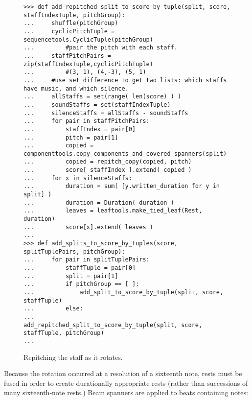 \begin{figure}[H]
\begin{lstlisting}[basicstyle=\scriptsize\ttfamily, breaklines=True, tabsize=4, showtabs=false, showspaces=false]
>>> def add_repitched_split_to_score_by_tuple(split, score, staffIndexTuple, pitchGroup):       
...     shuffle(pitchGroup)
...     cyclicPitchTuple = sequencetools.CyclicTuple(pitchGroup)
...         #pair the pitch with each staff.
...     staffPitchPairs = zip(staffIndexTuple,cyclicPitchTuple)
...         #(3, 1), (4,-3), (5, 1)
...     #use set difference to get two lists: which staffs have music, and which silence.
...     allStaffs = set(range( len(score) ) )
...     soundStaffs = set(staffIndexTuple)
...     silenceStaffs = allStaffs - soundStaffs
...     for pair in staffPitchPairs:
...         staffIndex = pair[0]
...         pitch = pair[1]
...         copied = componenttools.copy_components_and_covered_spanners(split)
...         copied = repitch_copy(copied, pitch)
...         score[ staffIndex ].extend( copied )
...     for x in silenceStaffs:
...         duration = sum( [y.written_duration for y in split] ) 
...         duration = Duration( duration )
...         leaves = leaftools.make_tied_leaf(Rest, duration)
...         score[x].extend( leaves )
... 
>>> def add_splits_to_score_by_tuples(score, splitTuplePairs, pitchGroup):
...     for pair in splitTuplePairs:
...         staffTuple = pair[0]
...         split = pair[1]
...         if pitchGroup == [ ]:
...             add_split_to_score_by_tuple(split, score, staffTuple)
...         else:
...             add_repitched_split_to_score_by_tuple(split, score, staffTuple, pitchGroup)
... \end{lstlisting}

\caption{Repitching the staff as it rotates. } 
\end{figure}

Because the rotation occurred at a resolution of a sixteenth note, rests must be fused in order to create durationally appropriate rests (rather than successions of many sixteenth-note rests.) Beam spanners are applied to beats containing notes:

